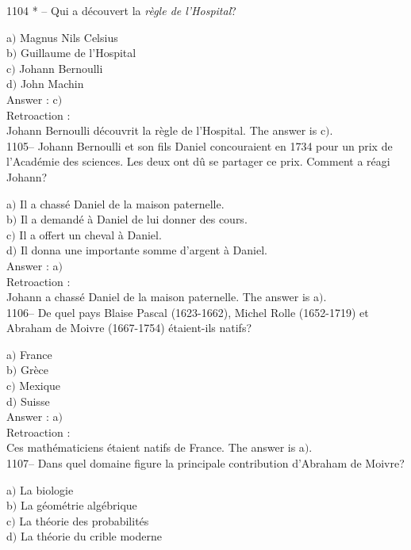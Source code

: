 ﻿\documentclass[letterpaper, 12pt]{article}
\begin{document}
1104 * -- Qui a d\'ecouvert la {\sl r\`egle de l'Hospital}?

a$)$ Magnus Nils Celsius \\
b$)$ Guillaume de l'Hospital \\
c$)$ Johann Bernoulli  \\
d$)$ John Machin  \\

Answer : c$)$\\

Retroaction : \\
Johann Bernoulli d\'ecouvrit la r\`egle de l'Hospital.
The answer is c$)$.\\

1105-- Johann Bernoulli et son fils Daniel concouraient en 1734 pour
un prix de l'Acad\'emie des sciences. Les deux ont d\^u se partager
ce prix. Comment a r\'eagi Johann?

a$)$ Il a chass\'e Daniel de la maison paternelle.  \\
b$)$ Il a demand\'e \`a Daniel de lui donner des cours. \\
c$)$ Il a offert un cheval \`a Daniel.  \\
d$)$ Il donna une importante somme d'argent \`a Daniel.  \\

Answer : a$)$\\

Retroaction : \\
Johann a chass\'e Daniel de la maison paternelle.
The answer is a$)$.\\

1106-- De quel pays Blaise Pascal (1623-1662), Michel Rolle
(1652-1719) et Abraham de Moivre (1667-1754) \'etaient-ils natifs?

a$)$ France  \\
b$)$ Gr\`ece \\
c$)$ Mexique  \\
d$)$ Suisse \\

Answer : a$)$\\

Retroaction :\\
Ces math\'ematiciens \'etaient natifs de France.
The answer is a$)$.\\

1107-- Dans quel domaine figure la principale contribution d'Abraham
de Moivre?

a$)$ La biologie  \\
b$)$ La g\'eom\'etrie alg\'ebrique \\
c$)$ La th\'eorie des probabilit\'es  \\
d$)$ La th\'eorie du crible moderne\\
\end{document}
